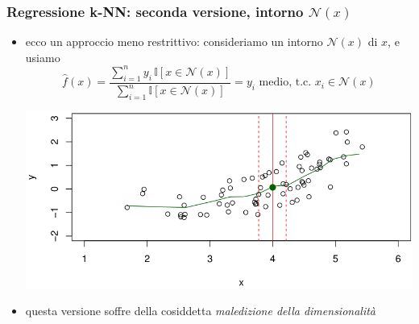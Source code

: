 \begin{frame}

	\frametitle{Regressione k-NN: seconda versione, intorno $\mathcal{N}(x)$}

	\begin{itemize}
		\item ecco un approccio meno restrittivo: consideriamo un intorno $\mathcal{N}(x)$ di $x$, e usiamo
			\[
				\widehat{f}(x) = \frac{\sum_{i=1}^n y_i\,\mathbb{I}[x\in\mathcal{N}(x)]}{\sum_{i=1}^n \mathbb{I}[x\in\mathcal{N}(x)]} = \mbox{$y_i$ medio, t.c. $x_i\in \mathcal{N}(x)$}
			\]
			\begin{center}
				\includegraphics[width=0.75\linewidth]{images/supervised/knn_regression/knn_regression.png}
			\end{center}
		\item questa versione soffre della cosiddetta \textit{maledizione della dimensionalità}
	\end{itemize}
	
\end{frame}


